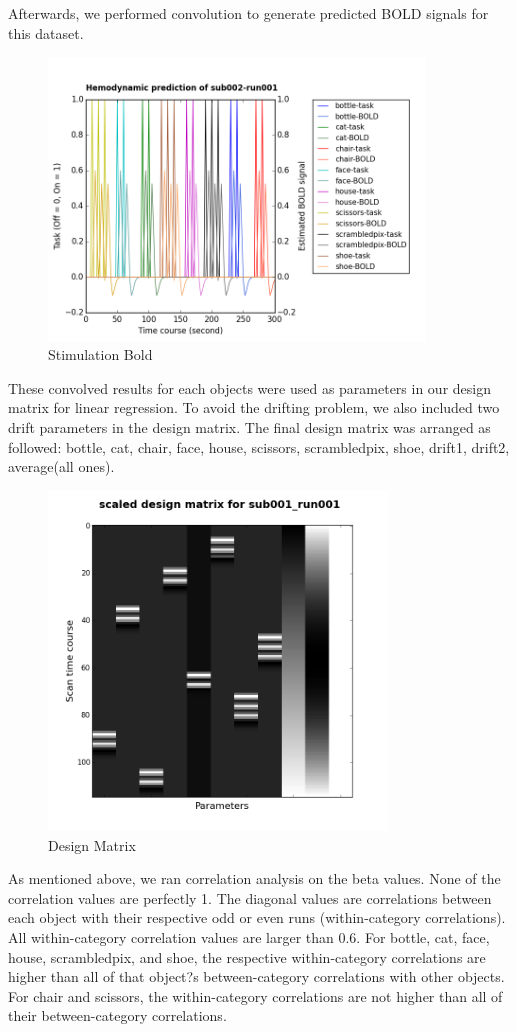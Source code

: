 \documentclass[11pt,twocolumn]{article}
\begin{document}
Afterwards, we performed convolution to generate predicted BOLD signals for this 
dataset.
\begin{figure}[h!]
\centering
\includegraphics[width=100mm]{sub002_run001_bold_prediction.png}
\caption{Stimulation Bold}
\end{figure}

These convolved results for each objects were used as parameters in 
our design matrix for linear regression. To avoid the drifting problem, we also 
included two drift parameters in the design matrix. The final design matrix was 
arranged as followed: bottle, cat, chair, face, house, scissors, scrambledpix, 
shoe, drift1, drift2, average(all ones). 
\begin{figure}[h!]
\centering
\includegraphics[width=90mm]{design_matrix_sub001_run001.png}
\caption{Design Matrix}
\end{figure}

As mentioned above, we ran correlation analysis on the beta values.
None of the correlation values are perfectly 1. The diagonal values 
are correlations between each object with their respective odd or 
even runs (within-category correlations). All within-category correlation 
values are larger than 0.6. For bottle, cat, face, house, scrambledpix, 
and shoe, the respective within-category correlations are higher than 
all of that object?s between-category correlations with other objects. 
For chair and scissors, the within-category correlations are not higher 
than all of their between-category correlations.
\end{document}

